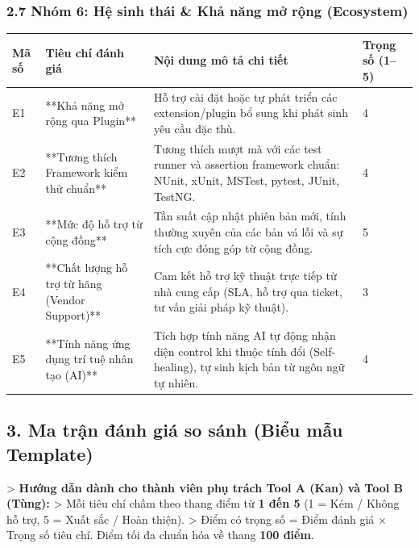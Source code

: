 \subsubsection{2.7 Nhóm 6: Hệ sinh thái \& Khả năng mở rộng (Ecosystem)}

\begin{table}[H]
\centering
\begin{tabular}{|l|l|l|l|}
\hline
\textbf{Mã số} & \textbf{Tiêu chí đánh giá} & \textbf{Nội dung mô tả chi tiết} & \textbf{Trọng số (1–5)} \\ \hline
E1 & **Khả năng mở rộng qua Plugin** & Hỗ trợ cài đặt hoặc tự phát triển các extension/plugin bổ sung khi phát sinh yêu cầu đặc thù. & 4 \\ \hline
E2 & **Tương thích Framework kiểm thử chuẩn** & Tương thích mượt mà với các test runner và assertion framework chuẩn: NUnit, xUnit, MSTest, pytest, JUnit, TestNG. & 4 \\ \hline
E3 & **Mức độ hỗ trợ từ cộng đồng** & Tần suất cập nhật phiên bản mới, tính thường xuyên của các bản vá lỗi và sự tích cực đóng góp từ cộng đồng. & 5 \\ \hline
E4 & **Chất lượng hỗ trợ từ hãng (Vendor Support)** & Cam kết hỗ trợ kỹ thuật trực tiếp từ nhà cung cấp (SLA, hỗ trợ qua ticket, tư vấn giải pháp kỹ thuật). & 3 \\ \hline
E5 & **Tính năng ứng dụng trí tuệ nhân tạo (AI)** & Tích hợp tính năng AI tự động nhận diện control khi thuộc tính đổi (Self-healing), tự sinh kịch bản từ ngôn ngữ tự nhiên. & 4 \\ \hline
\end{tabular}
\end{table}




\subsection{3. Ma trận đánh giá so sánh (Biểu mẫu Template)}

> \textbf{Hướng dẫn dành cho thành viên phụ trách Tool A (Kan) và Tool B (Tùng):}  
> Mỗi tiêu chí chấm theo thang điểm từ \textbf{1 đến 5} (1 = Kém / Không hỗ trợ, 5 = Xuất sắc / Hoàn thiện).  
> Điểm có trọng số = Điểm đánh giá × Trọng số tiêu chí. Điểm tối đa chuẩn hóa về thang \textbf{100 điểm}.

